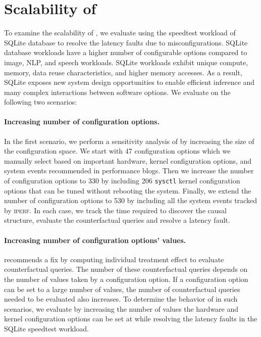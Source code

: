 \section{Scalability of \tool}

To examine the scalability of \tool, we evaluate \tool using the speedtest workload of SQLite database to resolve the latency faults due to misconfigurations. SQLite database workloads have a higher number of configurable options compared to image, NLP, and speech workloads. SQLite workloads exhibit unique compute, memory, data reuse characteristics, and higher memory accesses. As a result, SQLite exposes new system design opportunities to enable efficient inference and many complex interactions between software options. We evaluate \tool on the following two scenarios:

\noindent\paragraph{Increasing number of configuration options.} In the first scenario, we perform a sensitivity analysis of \tool by increasing the size of the configuration space. We start with 47 configuration options which we manually select based on important hardware, kernel configuration options, and system events recommended in performance blogs. Then we increase the number of configuration options to 330 by including 206 \texttt{sysctl} kernel configuration options that can be tuned without rebooting the system. Finally, we extend the number of configuration options to 530 by including all the system events tracked by \textsc{iperf}. In each case, we track the time required to discover the causal structure, evaluate the counterfactual queries and resolve a latency fault.  

\noindent\paragraph{Increasing number of configuration options' values.} \tool recommends a fix by computing individual treatment effect to evaluate counterfactual queries. The number of these counterfactual queries depends on the number of values taken by a configuration option. If a configuration option can be set to a large number of values, the number of counterfactual queries needed to be evaluated also increases. To determine the behavior of \tool in such scenarios, we evaluate \tool by increasing the number of values the hardware and kernel configuration options can be set at while resolving the latency faults in the SQLite speedtest workload. 
